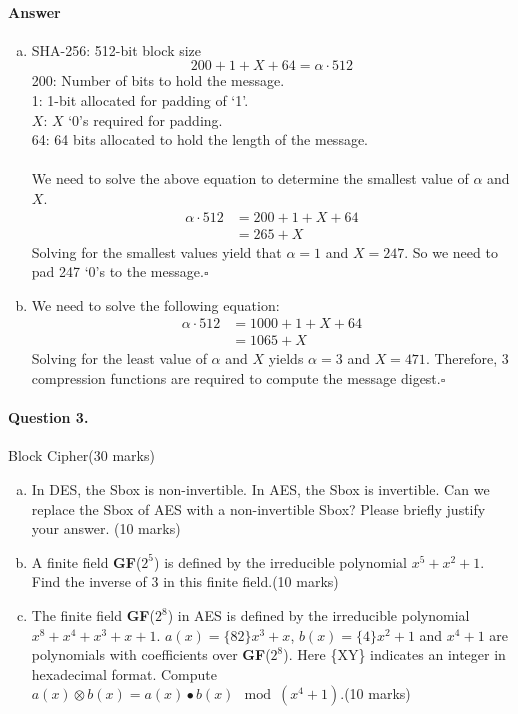 \documentclass[12pt]{article}
\newcommand{\EOQ}{\hfill $\square$}
\begin{document}
\paragraph{Answer}
\begin{enumerate}[(a)]
\item SHA-256: 512-bit block size
\begin{equation*}
200+1+X+64=\alpha\cdot 512
\end{equation*}
200: Number of bits to hold the message.\\
1: 1-bit allocated for padding of `1'.\\
$X$: $X$ `0's required for padding.\\
64: 64 bits allocated to hold the length of the message.\\\\We need to solve the above equation to determine the smallest value of $\alpha$ and $X$.
\begin{equation*}
\begin{split}
\alpha\cdot 512&=200+1+X+64\\
&=265+X
\end{split}
\end{equation*}
Solving for the smallest values yield that $\alpha=1$ and $X=247$. So we need to pad 247 `0's to the message.\EOQ

\item We need to solve the following equation:
\begin{equation*}
\begin{split}
\alpha\cdot512&=1000+1+X+64\\
&=1065+X
\end{split}
\end{equation*}
Solving for the least value of $\alpha$ and $X$ yields $\alpha=3$ and $X=471$. Therefore, 3 compression functions are required to compute the message digest.\EOQ
\end{enumerate}
\paragraph{Question 3.}   Block Cipher\hfill (30 marks)
\begin{enumerate}[(a)]
\item In DES, the Sbox is non-invertible. In AES, the Sbox is invertible. Can we replace the Sbox of AES with a non-invertible Sbox? Please briefly justify your answer. \hfill (10 marks)
\item A finite field \textbf{GF}($2^5$) is defined by the irreducible polynomial $x^5+x^2+1$. Find the inverse of 3 in this finite field.\hfill (10 marks)
\item The finite field \textbf{GF}($2^8$) in AES is defined by the irreducible polynomial $x^8+x^4+x^3+x+1$. $a(x)=\{82\}x^3+x$, $b(x)=\{4\}x^2+1$ and $x^4+1$ are polynomials with coefficients over \textbf{GF}($2^8$). Here \{XY\} indicates an integer in hexadecimal format. Compute $a(x)\otimes b(x)=a(x)\bullet b(x)\mod (x^4+1)$.\hfill (10 marks)
\end{enumerate}
\end{document}
